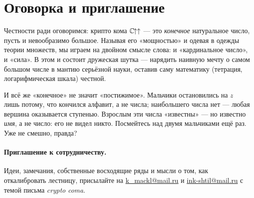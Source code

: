 \section{Оговорка и приглашение}
\label{sec:disclaimer}

Честности ради оговоримся: крипто кома \(\mathbb{C}\mkern-1.5mu{\uparrow\uparrow}\) --- это \emph{конечное} натуральное
число, пусть и невообразимо большое. Называя его «мощностью» и одевая в одежды теории
множеств, мы играем на двойном смысле слова: и «кардинальное число», и «сила». В этом и
состоит дружеская шутка --- нарядить наивную мечту о самом большом числе в мантию
серьёзной науки, оставив саму математику (тетрация, логарифмическая шкала) честной.

И всё же «конечное» не значит «постижимое». Мальчики остановились на \(z\) лишь потому, что
кончился алфавит, а не числа; наибольшего числа нет --- любая вершина оказывается ступенью.
Взрослым эти числа «известны» --- но известно \emph{имя}, а не число: его не видел никто.
Посмейтесь над двумя мальчиками ещё раз. Уже не смешно, правда?

\paragraph{Приглашение к сотрудничеству.} Идеи, замечания, собственные восходящие ряды и мысли о том, как откалибровать лестницу,
присылайте на \href{mailto:k_mackl@mail.ru?subject=crypto\%20coma}{k\_mackl@mail.ru}
и \href{mailto:ink-shtil@mail.ru?subject=crypto\%20coma}{ink-shtil@mail.ru} с темой письма
\emph{crypto coma}.
